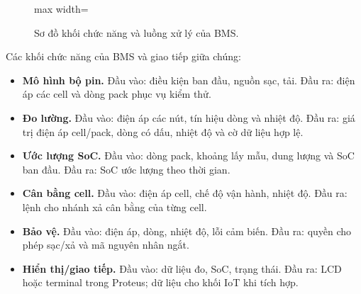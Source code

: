 \begin{figure}[H]
\centering
\begin{adjustbox}{max width=\linewidth}
\end{adjustbox}
\caption{Sơ đồ khối chức năng và luồng xử lý của BMS.}
\label{fig:bms}
\end{figure}

Các khối chức năng của BMS và giao tiếp giữa chúng:

\begin{itemize}
    \item \textbf{Mô hình bộ pin.} Đầu vào: điều kiện ban đầu, nguồn sạc, tải. Đầu ra: điện áp các cell và dòng pack phục vụ kiểm thử.
    \item \textbf{Đo lường.} Đầu vào: điện áp các nút, tín hiệu dòng và nhiệt độ. Đầu ra: giá trị điện áp cell/pack, dòng có dấu, nhiệt độ và cờ dữ liệu hợp lệ.
    \item \textbf{Ước lượng SoC.} Đầu vào: dòng pack, khoảng lấy mẫu, dung lượng và SoC ban đầu. Đầu ra: SoC ước lượng theo thời gian.
    \item \textbf{Cân bằng cell.} Đầu vào: điện áp cell, chế độ vận hành, nhiệt độ. Đầu ra: lệnh cho nhánh xả cân bằng của từng cell.
    \item \textbf{Bảo vệ.} Đầu vào: điện áp, dòng, nhiệt độ, lỗi cảm biến. Đầu ra: quyền cho phép sạc/xả và mã nguyên nhân ngắt.
    \item \textbf{Hiển thị/giao tiếp.} Đầu vào: dữ liệu đo, SoC, trạng thái. Đầu ra: LCD hoặc terminal trong Proteus; dữ liệu cho khối IoT khi tích hợp.
\end{itemize}

